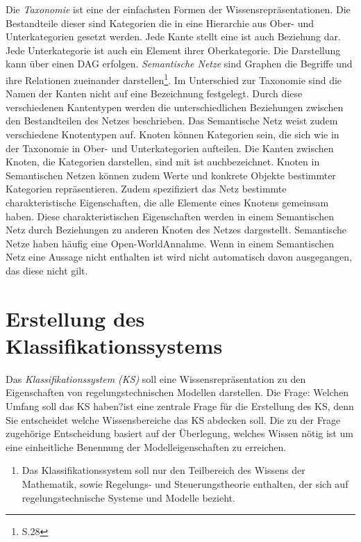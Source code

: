 Die \textit{Taxonomie} ist eine der einfachsten Formen der Wissensrepräsentationen. Die Bestandteile dieser sind Kategorien die in eine Hierarchie aus Ober- und Unterkategorien gesetzt werden. Jede Kante stellt eine \glqq ist auch \grqq Beziehung dar. Jede Unterkategorie ist auch ein Element ihrer Oberkategorie. Die Darstellung kann über einen DAG erfolgen. %
\textit{Semantische Netze} \glqq sind Graphen die Begriffe und ihre Relationen zueinander darstellen\grqq\footnote{\cite{STU09} S.28}. Im Unterschied zur Taxonomie sind die Namen der Kanten nicht auf eine Bezeichnung festgelegt. Durch diese verschiedenen Kantentypen werden die unterschiedlichen Beziehungen zwischen den Bestandteilen des Netzes beschrieben. Das Semantische Netz weist zudem verschiedene Knotentypen auf. Knoten können Kategorien sein, die sich wie in der Taxonomie in Ober- und Unterkategorien aufteilen. Die Kanten zwischen Knoten, die Kategorien darstellen, sind mit \glqq ist auch\grqq bezeichnet. Knoten in Semantischen Netzen können zudem Werte und konkrete Objekte bestimmter Kategorien repräsentieren. Zudem spezifiziert das Netz bestimmte charakteristische Eigenschaften, die alle Elemente eines Knotens gemeinsam haben. Diese charakteristischen Eigenschaften werden in einem Semantischen Netz durch Beziehungen zu anderen Knoten des Netzes dargestellt. Semantische Netze haben häufig eine \glq Open-World\grq  Annahme. Wenn in einem Semantischen Netz eine Aussage nicht enthalten ist wird nicht automatisch davon ausgegangen, das diese nicht gilt.
\section{Erstellung des Klassifikationssystems}
\label{Ch:ErstProz:Sec:KS}
Das \textit{Klassifikationssystem (KS)} soll eine Wissensrepräsentation zu den Eigenschaften von regelungstechnischen Modellen darstellen. 
Die Frage: \glqq Welchen Umfang soll das KS haben?\grqq ist eine zentrale Frage für die Erstellung des KS, denn Sie entscheidet welche Wissensbereiche das KS abdecken soll. Die zu der Frage zugehörige Entscheidung basiert auf der Überlegung, welches Wissen nötig ist um eine einheitliche Benennung der Modelleigenschaften zu erreichen. 
\begin{enumerate}[resume*]
	\item \label{E.KS_Umfang}Das Klassifikationssystem soll nur den Teilbereich des Wissens der Mathematik, sowie Regelungs- und Steuerungstheorie enthalten, der sich auf regelungstechnische Systeme und Modelle bezieht.
\end{enumerate}

